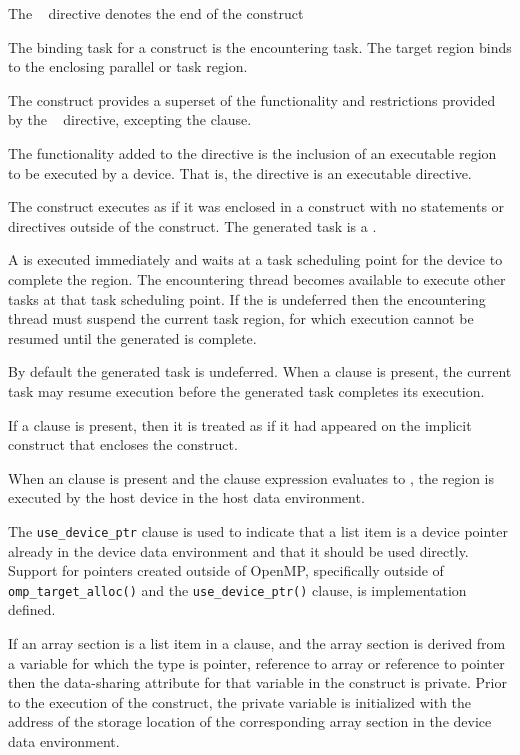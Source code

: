 The ~ directive denotes the end of the  construct
\fortranspecificend

\binding
The binding task for a  construct is the encountering task. The target region 
binds to the enclosing parallel or task region.

\descr
The  construct provides a superset of the functionality and
restrictions provided by the ~ directive, excepting
the  clause.

The functionality added to the  directive is the inclusion of an executable region to be executed by a device. That is, the  directive is an executable directive.

The  construct executes as if it was enclosed in a  construct with no statements or directives outside of the  construct. The generated task is a .

A  is executed immediately and waits at a task scheduling point for the device to complete the  region. The encountering thread becomes available to execute other tasks at that task scheduling point. If the  is undeferred then the encountering thread must suspend the current task region, for which execution cannot be resumed until the generated  is complete.

By default the generated task is undeferred. When a  clause is present, the current task may resume execution before the generated task completes its execution.

If a  clause is present, then it is treated as if it had appeared on the implicit  construct that encloses the  construct.

When an  clause is present and the  clause expression evaluates to , the  region is executed by the host device in the host data environment.

The \verb#use_device_ptr# clause is used to indicate that a list item is a device
pointer already in the device data environment and that it should be used
directly.  Support for pointers created outside of OpenMP, specifically
outside of \verb#omp_target_alloc()# and the \verb#use_device_ptr()# clause,
is implementation defined.

\ccppspecificstart
If an array section is a list item in a  clause, and the array section is derived from a variable for which the type is pointer, reference to array or reference to pointer then the data-sharing attribute for that variable in the construct is private.  Prior to the execution of the construct, the private variable is initialized with the address of the storage location of the corresponding array section in the device data environment.
\ccppspecificend

